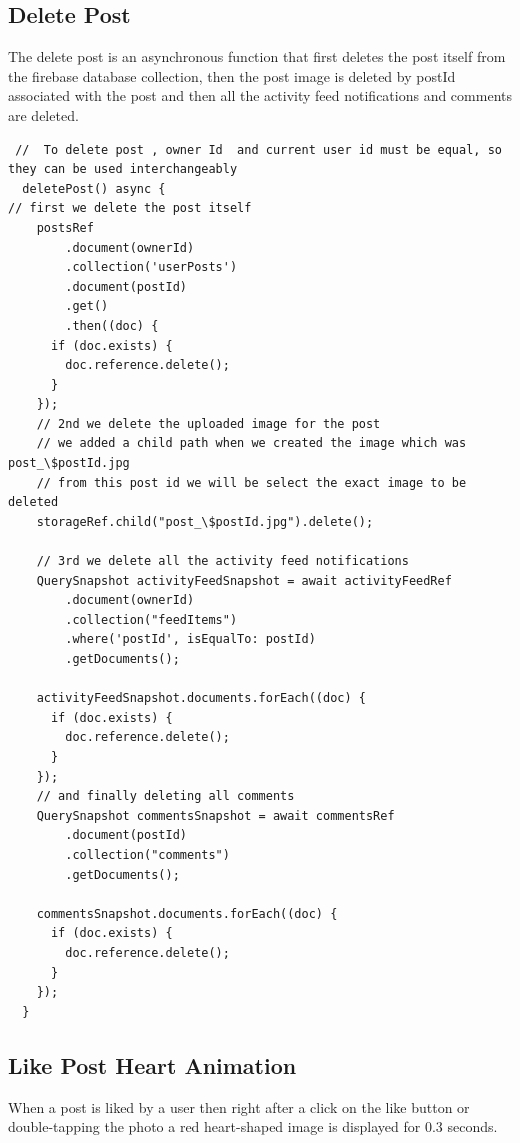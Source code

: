 \subsection{Delete Post}
The delete post is an asynchronous function that first deletes the post itself from the firebase database collection, then the post image is deleted by postId associated with the post and then all the activity feed notifications and comments are deleted.

\begin{verbatim}
 //  To delete post , owner Id  and current user id must be equal, so they can be used interchangeably
  deletePost() async {
// first we delete the post itself
    postsRef
        .document(ownerId)
        .collection('userPosts')
        .document(postId)
        .get()
        .then((doc) {
      if (doc.exists) {
        doc.reference.delete();
      }
    });
    // 2nd we delete the uploaded image for the post
    // we added a child path when we created the image which was post_\$postId.jpg
    // from this post id we will be select the exact image to be deleted
    storageRef.child("post_\$postId.jpg").delete();

    // 3rd we delete all the activity feed notifications
    QuerySnapshot activityFeedSnapshot = await activityFeedRef
        .document(ownerId)
        .collection("feedItems")
        .where('postId', isEqualTo: postId)
        .getDocuments();

    activityFeedSnapshot.documents.forEach((doc) {
      if (doc.exists) {
        doc.reference.delete();
      }
    });
    // and finally deleting all comments
    QuerySnapshot commentsSnapshot = await commentsRef
        .document(postId)
        .collection("comments")
        .getDocuments();

    commentsSnapshot.documents.forEach((doc) {
      if (doc.exists) {
        doc.reference.delete();
      }
    });
  }
\end{verbatim}

\subsection{Like Post Heart Animation}
When a post is liked by a user then right after a click on the like button or double-tapping the photo a red heart-shaped image is displayed for 0.3 seconds.

